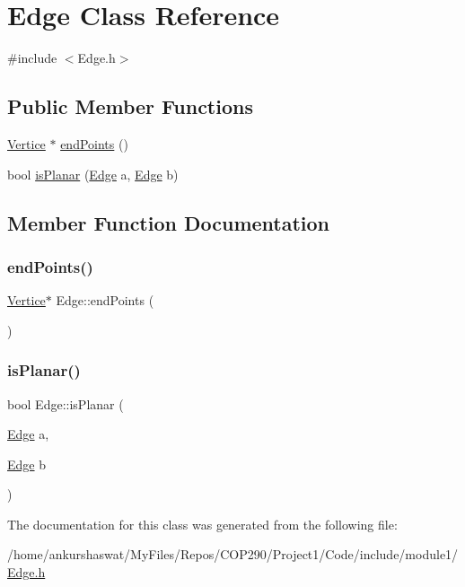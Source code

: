\hypertarget{classEdge}{}\section{Edge Class Reference}
\label{classEdge}


{\ttfamily \#include $<$Edge.\+h$>$}

\subsection*{Public Member Functions}
\begin{DoxyCompactItemize}
\item 
\hyperlink{classVertice}{Vertice} $\ast$ \hyperlink{classEdge_ad9735bd8ac4b59fcfcd76f2548b568b9}{end\+Points} ()
\item 
bool \hyperlink{classEdge_aa4f4fd6948d7f5170a0dea529b8b04d3}{is\+Planar} (\hyperlink{classEdge}{Edge} a, \hyperlink{classEdge}{Edge} b)
\end{DoxyCompactItemize}


\subsection{Member Function Documentation}
\mbox{\label{classEdge_ad9735bd8ac4b59fcfcd76f2548b568b9}} 
\subsubsection{\texorpdfstring{end\+Points()}{endPoints()}}
{\footnotesize\ttfamily \hyperlink{classVertice}{Vertice}$\ast$ Edge\+::end\+Points (\begin{DoxyParamCaption}{ }\end{DoxyParamCaption})}

\mbox{\label{classEdge_aa4f4fd6948d7f5170a0dea529b8b04d3}} 
\subsubsection{\texorpdfstring{is\+Planar()}{isPlanar()}}
{\footnotesize\ttfamily bool Edge\+::is\+Planar (\begin{DoxyParamCaption}\item[{\hyperlink{classEdge}{Edge}}]{a,  }\item[{\hyperlink{classEdge}{Edge}}]{b }\end{DoxyParamCaption})}



The documentation for this class was generated from the following file\+:\begin{DoxyCompactItemize}
\item 
/home/ankurshaswat/\+My\+Files/\+Repos/\+C\+O\+P290/\+Project1/\+Code/include/module1/\hyperlink{Edge_8h}{Edge.\+h}\end{DoxyCompactItemize}

